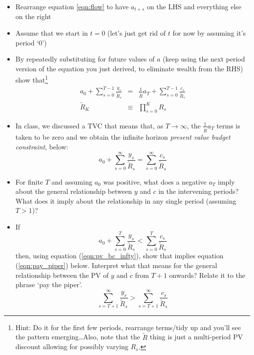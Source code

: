 \documentclass[authoryear,11pt]{elsarticle}
\begin{document}
\begin{itemize}
\item	Rearrange equation \ref{eqn:flow} to have $a_{t+s}$ on the LHS and everything else on the right
\item	Assume that we start in $t=0$ (let's just get rid of $t$ for now by assuming it's period `0')
\item	By repeatedly substituting for future values of $a$ (keep using the next period version of the equation you just derived, to eliminate  wealth from the RHS) show that\footnote{Hint: Do it for the first few periods, rearrange terms/tidy up and you'll see the pattern emerging\ldots Also, note that the $\tilde{R}$ thing is just a multi-period PV discount allowing for possibly varying $R_{s}$.}
\begin{eqnarray}
a_{0} + \sum\limits_{s=0}^{T-1} \frac{y_{s}}{\tilde{R}_{s}} &=& \frac{1}{\tilde{R}}a_{T} + \sum\limits_{s=0}^{T-1} \frac{c_{s}}{\tilde{R}_{s}} \label{eqn:pv_bc_T} \\
\tilde{R}_{K} &\equiv& \prod\limits_{s=0}^{K} R_{s} \label{eqn:pv_bc_T}
\end{eqnarray}
\item	In class, we discussed a TVC that means that, as $T\rightarrow\infty$, the $\frac{1}{\tilde{R}}a_{T}$ terms is taken to be zero and we obtain the infinite horizon \textit{present value budget constraint}, below:
\begin{equation}
a_{0} + \sum\limits_{s=0}^{\infty} \frac{y_{s}}{\tilde{R}_{s}} = \sum\limits_{s=0}^{\infty} \frac{c_{s}}{\tilde{R}_{s}} \label{eqn:pv_bc_infty}
\end{equation}
\item	For finite $T$ and assuming $a_{0}$ was positive, what does a negative $a_{T}$ imply about the general relationship between $y$ and $c$ in the intervening periods? What does it imply about the relationship in any single period (assuming $T>1$)?
\item	If $$a_{0} + \sum\limits_{s=0}^{T} \frac{y_{s}}{\tilde{R}_{s}} < \sum\limits_{s=0}^{T} \frac{c_{s}}{\tilde{R}_{s}}$$ then, using equation (\ref{eqn:pv_bc_infty}), show that implies equation (\ref{eqn:pay_piper}) below. Interpret what that means for the general relationship between the PV of $y$ and $c$ from $T+1$ onwards? Relate it to the phrase `pay the piper'.
\begin{equation}
\sum\limits_{s=T+1}^{\infty} \frac{y_{s}}{\tilde{R}_{s}} > \sum\limits_{s=T+1}^{\infty} \frac{c_{s}}{\tilde{R}_{s}} \label{eqn:pay_piper}
\end{equation}
\end{itemize}
\end{document}
